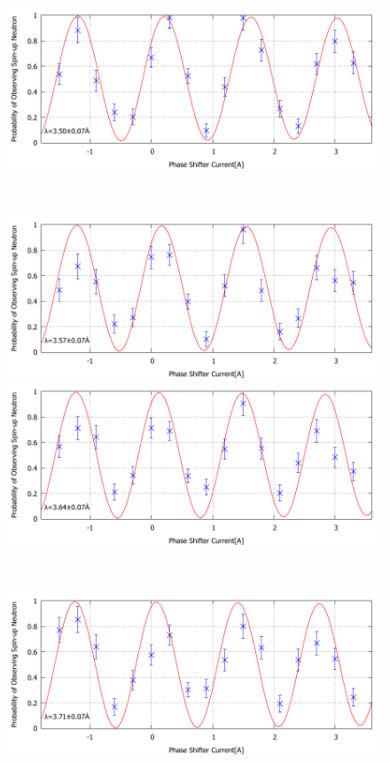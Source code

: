 \begin{figure}[H]
\begin{minipage}{0.5\hsize}
\end{minipage}
\begin{minipage}{0.5\hsize}
\includegraphics[width=\hsize]{discussion/BG/IT_eb_490.pdf}
\end{minipage}\\
\begin{minipage}{0.5\hsize}
\includegraphics[width=\hsize]{discussion/BG/IT_eb_500.pdf}
\end{minipage}
\begin{minipage}{0.5\hsize}
\includegraphics[width=\hsize]{discussion/BG/IT_eb_510.pdf}
\end{minipage}\\
\begin{minipage}{0.5\hsize}
\includegraphics[width=\hsize]{discussion/BG/IT_eb_520.pdf}

\end{minipage}
\end{figure}
